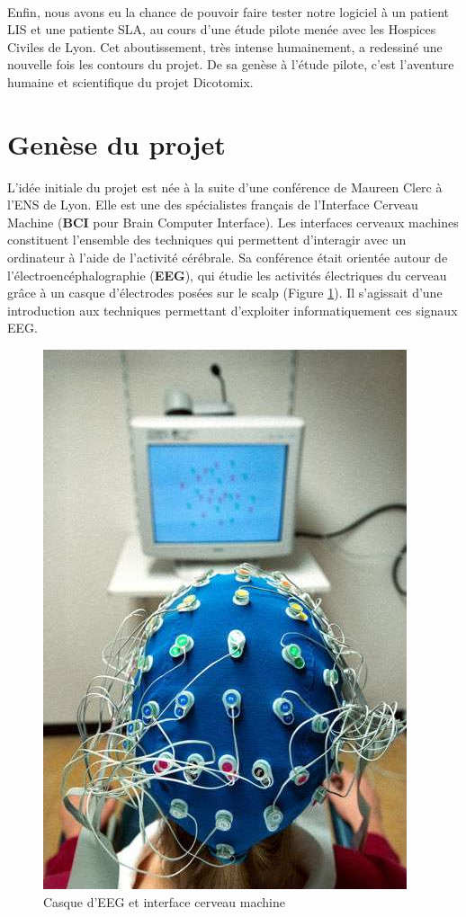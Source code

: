 \documentclass[11pt,a4paper]{article}
\theoremstyle{plain}
\theoremstyle{definition}
\begin{document}
\paragraph{} Enfin, nous avons eu la chance de pouvoir faire tester notre logiciel à un patient LIS et une patiente SLA, au cours d'une étude pilote menée avec les Hospices Civiles de Lyon.
Cet aboutissement, très intense humainement, a redessiné une nouvelle fois les contours du projet. De sa genèse à l'étude pilote, c'est l'aventure humaine et scientifique du projet Dicotomix.


\section{Genèse du projet}

L'idée initiale du projet est née à la suite d'une conférence de Maureen Clerc à l'ENS de Lyon. Elle est une des spécialistes français de l'Interface Cerveau Machine (\textbf{BCI} pour Brain Computer Interface).
Les interfaces cerveaux machines constituent l'ensemble des techniques qui permettent d'interagir avec un ordinateur à l'aide de l'activité cérébrale. Sa conférence était orientée autour de l'électroencéphalographie (\textbf{EEG}), qui étudie les activités électriques du cerveau grâce à un casque d'électrodes posées sur le scalp (Figure \ref{eeg}). Il s'agissait d'une introduction aux techniques permettant d'exploiter informatiquement ces signaux EEG.

\begin{figure}[ht]
\centering
\includegraphics[scale=0.3]{images/electroencephalogramme.jpg}
\caption{Casque d'EEG et interface cerveau machine}
\label{eeg}
\end{figure}
\end{document}
